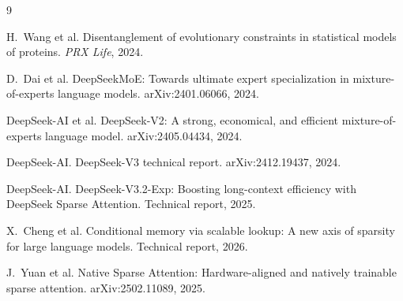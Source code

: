 \documentclass[10pt]{article}
\begin{document}
\scriptsize
\begin{thebibliography}{9}

H.~Wang et al.
\newblock Disentanglement of evolutionary constraints in statistical models of proteins.
\newblock \emph{PRX Life}, 2024.

D.~Dai et al.
\newblock DeepSeekMoE: Towards ultimate expert specialization in mixture-of-experts language models.
\newblock arXiv:2401.06066, 2024.

DeepSeek-AI et al.
\newblock DeepSeek-V2: A strong, economical, and efficient mixture-of-experts language model.
\newblock arXiv:2405.04434, 2024.

DeepSeek-AI.
\newblock DeepSeek-V3 technical report.
\newblock arXiv:2412.19437, 2024.

DeepSeek-AI.
\newblock DeepSeek-V3.2-Exp: Boosting long-context efficiency with DeepSeek Sparse Attention.
\newblock Technical report, 2025.

X.~Cheng et al.
\newblock Conditional memory via scalable lookup: A new axis of sparsity for large language models.
\newblock Technical report, 2026.

J.~Yuan et al.
\newblock Native Sparse Attention: Hardware-aligned and natively trainable sparse attention.
\newblock arXiv:2502.11089, 2025.

\end{thebibliography}
\end{document}
